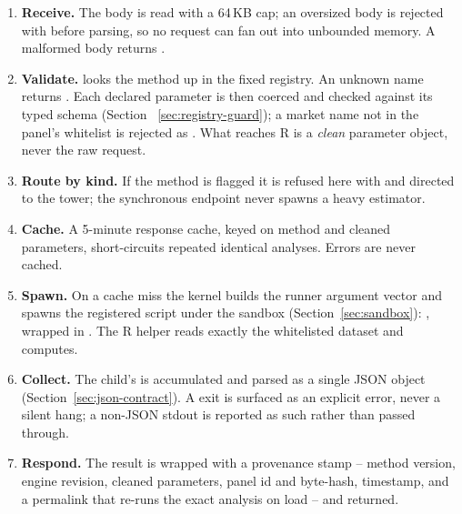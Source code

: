 \begin{enumerate}[leftmargin=2em,itemsep=2pt]
\item \textbf{Receive.} The body is read with a 64\,KB cap; an oversized body is
  rejected with  before parsing, so no request can fan out into unbounded
  memory. A malformed body returns .
\item \textbf{Validate.}  looks the method up in the
  fixed registry. An unknown name returns . Each declared
  parameter is then coerced and checked against its typed schema (Section~%
  \ref{sec:registry-guard}); a market name not in the panel's whitelist is rejected
  as . What reaches R is a \emph{clean} parameter object, never
  the raw request.
\item \textbf{Route by kind.} If the method is flagged  it is
  refused here with  and directed
  to the tower; the synchronous endpoint never spawns a heavy estimator.
\item \textbf{Cache.} A 5-minute response cache, keyed on method and cleaned
  parameters, short-circuits repeated identical analyses. Errors are never cached.
\item \textbf{Spawn.} On a cache miss the kernel builds the runner argument vector
  and spawns the registered script under the sandbox (Section~\ref{sec:sandbox}):
  , wrapped in . The R
  helper reads exactly the whitelisted dataset and computes.
\item \textbf{Collect.} The child's  is accumulated and parsed as a
  single JSON object (Section~\ref{sec:json-contract}). A  exit is
  surfaced as an explicit  error, never a silent hang; a
  non-JSON stdout is reported as such rather than passed through.
\item \textbf{Respond.} The result is wrapped with a provenance stamp -- method
  version, engine revision, cleaned parameters, panel id and byte-hash, timestamp,
  and a permalink that re-runs the exact analysis on load -- and returned.
\end{enumerate}

